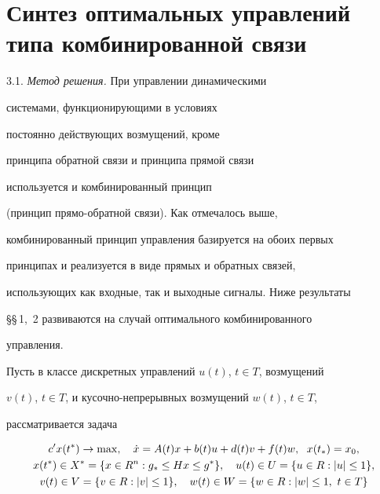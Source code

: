 \section{Синтез оптимальных управлений типа комбинированной связи}





3.1. {\it Метод решения.} При управлении динамическими


системами, функционирующими в условиях


постоянно действующих возмущений, кроме


принципа обратной связи и принципа прямой связи


используется и комбинированный принцип


(принцип прямо-обратной связи). Как отмечалось выше,


комбинированный принцип управления базируется на обоих первых


принципах и реализуется в виде прямых и обратных связей,


использующих как входные, так и выходные сигналы. Ниже результаты


\S\S\,1,~2 развиваются на случай оптимального комбинированного


управления.





Пусть в классе дискретных управлений $u(t)$, $t \in T$, возмущений


$v(t)$, $t \in T$, и кусочно-непрерывных возмущений $w(t)$, $t \in T$,


рассматривается задача


\begin{gather}


c'x(t^*)\rightarrow \max,\quad \Dot x = A(t) x+b(t)u+d(t)v+f(t)w,


\ \; x(t_{*})=x_{0}, \\


%


x(t^*) \in X^*=\{x \in R^n:g_{*} \le Hx\le g^*\},\quad u(t) \in U=\{u


\in R:|u| \le 1 \}, \notag \\


%


v(t) \in V=\{v \in R:|v| \le 1\},\quad w(t) \in W=\{w \in R:|w|\le 1,


\ t \in T \} \notag


\end{gather}


